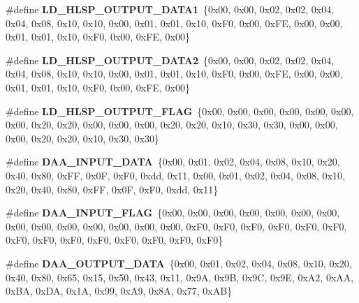 \begin{DoxyCompactItemize}
\#define {\bfseries L\+D\+\_\+\+H\+L\+S\+P\+\_\+\+O\+U\+T\+P\+U\+T\+\_\+\+D\+A\+T\+A1}~\{0x00, 0x00, 0x02, 0x02, 0x04, 0x04, 0x08, 0x10, 0x10, 0x00, 0x01, 0x01, 0x10, 0x\+F0, 0x00, 0x\+F\+E, 0x00, 0x00, 0x01, 0x01, 0x10, 0x\+F0, 0x00, 0x\+F\+E, 0x00\}
\item 
\mbox{\label{unit-test-cpu-dispatch_8c_a11435b77121020da76cfabbb81ce0184}} 
\#define {\bfseries L\+D\+\_\+\+H\+L\+S\+P\+\_\+\+O\+U\+T\+P\+U\+T\+\_\+\+D\+A\+T\+A2}~\{0x00, 0x00, 0x02, 0x02, 0x04, 0x04, 0x08, 0x10, 0x10, 0x00, 0x01, 0x01, 0x10, 0x\+F0, 0x00, 0x\+F\+E, 0x00, 0x00, 0x01, 0x01, 0x10, 0x\+F0, 0x00, 0x\+F\+E, 0x00\}
\item 
\mbox{\label{unit-test-cpu-dispatch_8c_a793fb9351a908e60f9117581259c2264}} 
\#define {\bfseries L\+D\+\_\+\+H\+L\+S\+P\+\_\+\+O\+U\+T\+P\+U\+T\+\_\+\+F\+L\+AG}~\{0x00, 0x00, 0x00, 0x00, 0x00, 0x00, 0x00, 0x20, 0x20, 0x00, 0x00, 0x00, 0x20, 0x20, 0x10, 0x30, 0x30, 0x00, 0x00, 0x00, 0x20, 0x20, 0x10, 0x30, 0x30\}
\item 
\mbox{\label{unit-test-cpu-dispatch_8c_a9156171d35ef4c0e9b8b64615315dbd6}} 
\#define {\bfseries D\+A\+A\+\_\+\+I\+N\+P\+U\+T\+\_\+\+D\+A\+TA}~\{0x00, 0x01, 0x02, 0x04, 0x08, 0x10, 0x20, 0x40, 0x80, 0x\+F\+F, 0x0\+F, 0x\+F0, 0xdd, 0x11, 0x00, 0x01, 0x02, 0x04, 0x08, 0x10, 0x20, 0x40, 0x80, 0x\+F\+F, 0x0\+F, 0x\+F0, 0xdd, 0x11\}
\item 
\mbox{\label{unit-test-cpu-dispatch_8c_a8da3904eaa9a16464c42a8c11217a926}} 
\#define {\bfseries D\+A\+A\+\_\+\+I\+N\+P\+U\+T\+\_\+\+F\+L\+AG}~\{0x00, 0x00, 0x00, 0x00, 0x00, 0x00, 0x00, 0x00, 0x00, 0x00, 0x00, 0x00, 0x00, 0x00, 0x\+F0, 0x\+F0, 0x\+F0, 0x\+F0, 0x\+F0, 0x\+F0, 0x\+F0, 0x\+F0, 0x\+F0, 0x\+F0, 0x\+F0, 0x\+F0, 0x\+F0, 0x\+F0\}
\item 
\mbox{\label{unit-test-cpu-dispatch_8c_a9ae1252dff7da03320bdc7ec1f90a89c}} 
\#define {\bfseries D\+A\+A\+\_\+\+O\+U\+T\+P\+U\+T\+\_\+\+D\+A\+TA}~\{0x00, 0x01, 0x02, 0x04, 0x08, 0x10, 0x20, 0x40, 0x80, 0x65, 0x15, 0x50, 0x43, 0x11, 0x9\+A, 0x9\+B, 0x9\+C, 0x9\+E, 0x\+A2, 0x\+A\+A, 0x\+B\+A, 0x\+D\+A, 0x1\+A, 0x99, 0x\+A9, 0x8\+A, 0x77, 0x\+A\+B\}
\item 
\mbox{\label{unit-test-cpu-dispatch_8c_a7d52abbcc7e576164da93ab8381f3ff5}} 

\end{DoxyCompactItemize}
